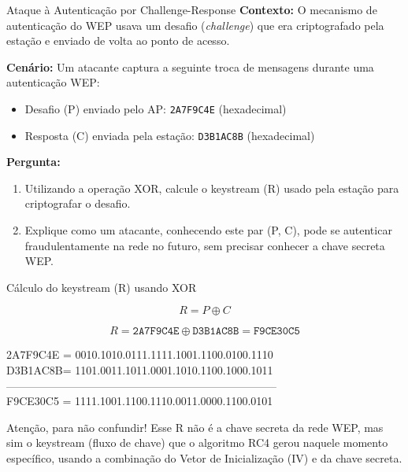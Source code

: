 \begin{frame}{Ataque à Autenticação por Challenge-Response}
    \textbf{Contexto:} O mecanismo de autenticação do WEP usava um desafio (\textit{challenge}) que era criptografado pela estação e enviado de volta ao ponto de acesso.

    \medskip
    \textbf{Cenário:} Um atacante captura a seguinte troca de mensagens durante uma autenticação WEP:

    \begin{itemize}
        \item Desafio (P) enviado pelo AP: \texttt{2A7F9C4E} (hexadecimal)
        \item Resposta (C) enviada pela estação: \texttt{D3B1AC8B} (hexadecimal)
    \end{itemize}


    \textbf{Pergunta:}
    \begin{enumerate}


        \item Utilizando a operação XOR, calcule o keystream (R) usado pela estação para criptografar o desafio.

        \item Explique como um atacante, conhecendo este par (P, C), pode se autenticar fraudulentamente na rede no futuro, sem precisar conhecer a chave secreta WEP.
    \end{enumerate}

\end{frame}


\begin{frame}{Cálculo do keystream (R) usando XOR}

    \[
        R = P \oplus C
    \]

    \[
        R = \texttt{2A7F9C4E} \oplus \texttt{D3B1AC8B} = \texttt{F9CE30C5}
    \]

    2A7F9C4E =  0010.1010.0111.1111.1001.1100.0100.1110\\
    D3B1AC8B= 1101.0011.1011.0001.1010.1100.1000.1011\\
    --------------------------------------------------------------------------\\
    F9CE30C5 = 1111.1001.1100.1110.0011.0000.1100.0101

    \begin{block}{Atenção, para não confundir!}
        Esse R não é a chave secreta da rede WEP, mas sim o keystream (fluxo de chave) que o algoritmo RC4 gerou naquele momento específico, usando a combinação do Vetor de Inicialização (IV) e da chave secreta.
    \end{block}
\end{frame}

